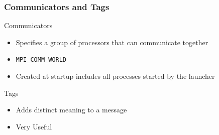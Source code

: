 \documentclass{beamer}
\begin{document}
\begin{frame}
 \frametitle{Communicators and Tags}
  \begin{block}{Communicators}
   \begin{itemize}
     \item<1->Specifies a group of processors that can communicate together
     \item<2->\texttt{MPI\_COMM\_WORLD}
     \item<2->Created at startup includes all processes started by the launcher
   \end{itemize}
  \end{block}
  \begin{block}{Tags}
    \begin{itemize}
     \item<3->Adds distinct meaning to a message
     \item<4->Very Useful
    \end{itemize}
  \end{block}

\end{frame}
\end{document}
